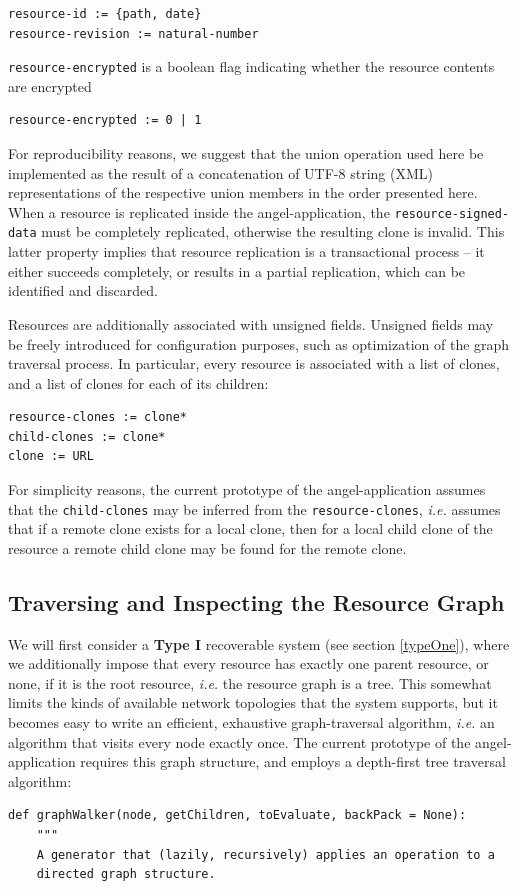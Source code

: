 \documentclass[11pt]{article}
\begin{document}
\begin{mainmatter}
\begin{verbatim}
resource-id := {path, date}
resource-revision := natural-number
\end{verbatim} 
\texttt{resource-encrypted} is a boolean flag indicating whether the resource contents are encrypted
\begin{verbatim}
resource-encrypted := 0 | 1
\end{verbatim}
For reproducibility reasons, we suggest that the union operation used here be implemented as the result of a concatenation of UTF-8 string (XML) representations of the respective union members in the order presented here. When a resource is replicated inside the angel-application, the \texttt{resource-signed-data} must be completely replicated, otherwise the resulting clone is invalid. This latter property implies that resource replication is a transactional process -- it either succeeds completely, or results in a partial replication, which can be identified and discarded. \label{transaction}

Resources are additionally associated with unsigned fields. Unsigned fields may be freely introduced for configuration purposes, such as optimization of the graph traversal process. In particular, every resource is associated with a list of clones, and a list of clones for each of its children:
\begin{verbatim}
resource-clones := clone*
child-clones := clone*
clone := URL
\end{verbatim}
For simplicity reasons, the current prototype of the angel-application assumes that the \texttt{child-clones} may be inferred from the \texttt{resource-clones}, \emph{i.e.} assumes that if a remote clone exists for a local clone, then for a local child clone of the resource a remote child clone may be found for the remote clone.

\subsection{Traversing and Inspecting the Resource Graph}
\label{traverse}
We will first consider a \textbf{Type I} recoverable system (see section \ref{typeOne}), where we additionally impose that every resource has exactly one parent resource, or none, if it is the root resource, \emph{i.e.} the resource graph is a tree. This somewhat limits the kinds of available network topologies that the system supports, but it becomes easy to write an efficient, exhaustive graph-traversal algorithm, \emph{i.e.} an algorithm that visits every node exactly once. The current prototype of the angel-application requires this graph structure, and employs a depth-first tree traversal algorithm:
\begin{verbatim}
def graphWalker(node, getChildren, toEvaluate, backPack = None):
    """
    A generator that (lazily, recursively) applies an operation to a 
    directed graph structure.
    

\end{verbatim}
\end{mainmatter}
\end{document}
